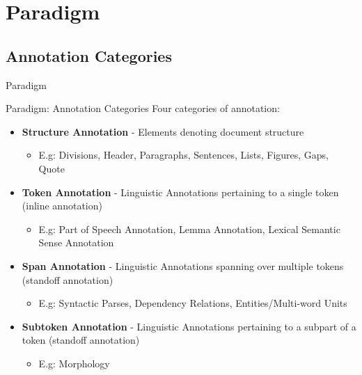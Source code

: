 \documentclass[compress,10pt]{beamer}
\begin{document}
       
\section{Paradigm}

\subsection{Annotation Categories}

\begin{frame}{Paradigm}
    \begin{block}{Paradigm: Annotation Categories}
        Four categories of annotation:    
        \begin{itemize}            
            \item \textbf{Structure Annotation} - Elements denoting document structure
            \begin{itemize}
                \item {\footnotesize E.g: Divisions, Header, Paragraphs, Sentences, Lists, Figures, Gaps, Quote }
            \end{itemize}
            \item \textbf{Token Annotation} - Linguistic Annotations pertaining to a single token (inline annotation)
            \begin{itemize}
                \item {\footnotesize E.g: Part of Speech Annotation, Lemma Annotation, Lexical Semantic Sense Annotation }
            \end{itemize}
            \item \textbf{Span Annotation} - Linguistic Annotations spanning over multiple tokens (standoff annotation)
            \begin{itemize}
                \item {\footnotesize E.g: Syntactic Parses, Dependency Relations, Entities/Multi-word Units}
            \end{itemize}
			\item \textbf{Subtoken Annotation} - Linguistic Annotations pertaining to a subpart of a token (standoff annotation)
            \begin{itemize}
                \item {\footnotesize E.g: Morphology}
            \end{itemize}
        \end{itemize}           
    \end{block}
\end{frame}
\end{document}
